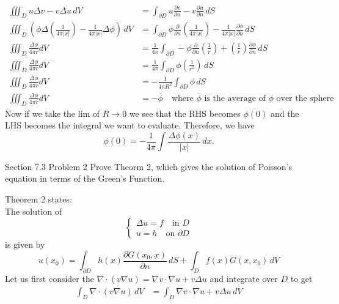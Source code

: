 \documentclass[answers,12pt,addpoints]{exam}
\begin{document}
\begin{questions}
\begin{solution}
        \begin{align*}
            \iiint_D u \Delta v - v \Delta u \, dV &= \int_{\partial D} u \frac{\partial v}{\partial n} - v \frac{\partial u}{\partial n} \, dS\\
            \iiint_D \left( \phi \Delta \left(\frac{1}{4\pi|x|}\right) - \frac{1}{4\pi|x|} \Delta \phi \right) \, dV &= \int_{\partial D} \phi \frac{\partial}{\partial n} \left(\frac{1}{4\pi|x|}\right) - \frac{1}{4\pi|x|} \frac{\partial \phi}{\partial n} \, dS\\
            \iiint_D \frac{\Delta \phi}{4 \pi r} dV &= \frac{1}{4\pi} \int_{\partial D} -\phi \frac{\partial}{\partial n} \left(\frac{1}{r}\right) + \left( \frac{1}{r}\right) \frac{\partial \phi}{\partial n} \, dS\\
            \iiint_D \frac{\Delta \phi}{4 \pi r} dV &= \frac{1}{4\pi} \int_{\partial D} \phi  \left(\frac{1}{r^2}\right) \, dS\\
            \iiint_D \frac{\Delta \phi}{4 \pi r} dV &= -\frac{1}{4\pi R^2} \int_{\partial D} \phi \, dS\\
            \iiint_D \frac{\Delta \phi}{4 \pi r} dV &= -\overline{\phi} \quad \text{where } \overline{\phi} \text{ is the average of } \phi \text{ over the sphere}
        \end{align*} 
        Now if we take the lim of $R \to 0$ we see that the RHS becomes $\phi(0)$ and the LHS becomes the integral we want to evaluate. Therefore, we have
        $$
        \phi(0) = -\frac{1}{4\pi} \int \frac{\Delta \phi(x)}{|x|} \, dx.
        $$
    \end{solution}
    \question Section 7.3 Problem 2
    Prove Theorm 2, which gives the solution of Poisson's equation in terms of the Green's Function.
    \begin{solution}
        Theorem 2 states:\\
        The solution of 
        $$\begin{cases}
            \Delta u = f \quad \text{in } D\\
            u = h \quad \text{on } \partial D
        \end{cases}$$
        is given by
        $$u(x_0) = \int_{\partial D} h(x) \frac{\partial G(x_0, x)}{\partial n} \, dS + \int_D f(x) G(x,x_0) \, dV$$
        Let us first consider the $\nabla \cdot (v \nabla u) = \nabla v \cdot \nabla u + v \Delta u$ and integrate over $D$ to get
        \begin{align*}
            \int_D \nabla \cdot (v \nabla u) \, dV &= \int_D \nabla v \cdot \nabla u + v \Delta u \, dV\\

\end{align*}
\end{solution}
\end{questions}
\end{document}
